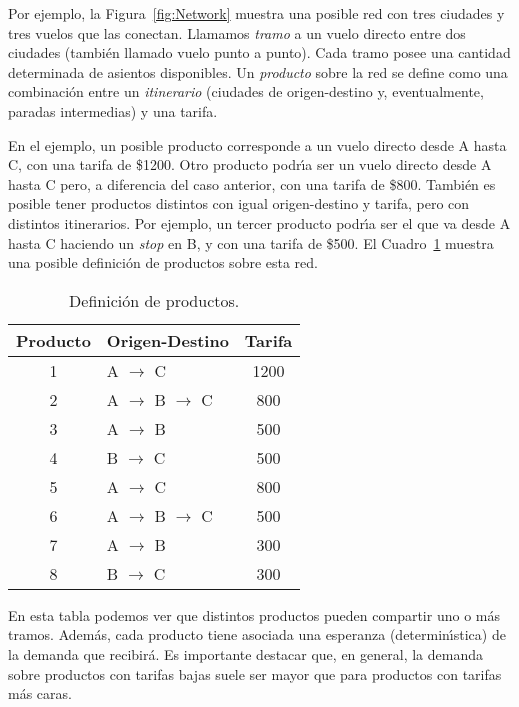 Por ejemplo, la Figura~\ref{fig:Network} muestra una posible red con tres
ciudades y tres vuelos que las conectan.
Llamamos \emph{tramo} a un vuelo directo entre dos ciudades (tambi\'en
llamado vuelo punto a punto). Cada tramo posee una cantidad determinada de
asientos disponibles. Un \emph{producto} sobre la red se define como una
combinaci\'on entre un \emph{itinerario} (ciudades de origen-destino y,
eventualmente, paradas intermedias) y una tarifa.

En el ejemplo, un posible
producto corresponde a un vuelo directo desde A hasta C, con una tarifa de
\$1200. Otro producto podr\'{\i}a ser un vuelo directo desde A hasta C pero,
a diferencia del caso anterior, con una tarifa de \$800. Tambi\'en es
posible tener productos distintos con igual origen-destino y tarifa, pero
con distintos itinerarios. Por ejemplo, un tercer producto podr\'\i a ser
el que va desde A hasta C haciendo un \emph{stop} en B, y con una tarifa de
\$500. El Cuadro~\ref{table:Products} muestra una posible definici\'on de
productos sobre esta red.

\begin{table}[!h]
{\small
\begin{center}
\begin{tabular}{|c|l|c|}
\hline
Producto & Origen-Destino & Tarifa\\
\hline
1 & A $\rightarrow$ C & 1200\\
2 & A $\rightarrow$ B $\rightarrow$ C & 800\\
3 & A $\rightarrow$ B & 500\\
4 & B $\rightarrow$ C & 500\\
5 & A $\rightarrow$ C & 800\\
6 & A $\rightarrow$ B $\rightarrow$ C & 500\\
7 & A $\rightarrow$ B & 300\\
8 & B $\rightarrow$ C & 300\\
\hline
\end{tabular}
\caption{Definici\'on de productos.}
\label{table:Products}
\end{center}
}
\vspace*{-4mm}
\end{table}

En esta tabla podemos ver que distintos productos pueden compartir uno o m\'as
tramos. Adem\'as, cada producto tiene asociada una esperanza
(determin\'{\i}stica) de la demanda que recibir\'a. Es importante destacar
que, en general, la demanda sobre productos con tarifas bajas suele
ser mayor que para productos con tarifas m\'as caras.

